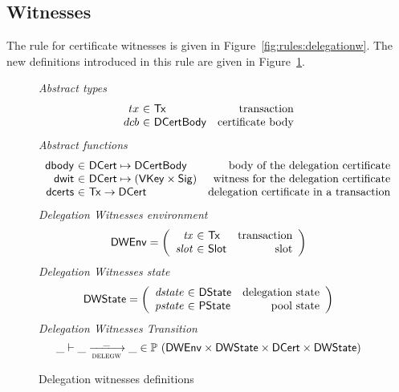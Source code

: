 \begin{figure}
\end{figure}

\subsection{Witnesses}
\label{sec:delegation-witnesses}

The rule for certificate witnesses is given in
Figure~\ref{fig:rules:delegationw}. The new definitions introduced in this rule
are given in Figure~\ref{fig:defs:delegationw}.

\begin{figure}
  \emph{Abstract types}
  \begin{equation*}
    \begin{array}{r@{~\in~}lr}
      tx & \Tx & \text{transaction}\\
      dcb & \DCertBody & \text{certificate body}\\
    \end{array}
  \end{equation*}
  \emph{Abstract functions}
  \begin{equation*}
    \begin{array}{r@{~\in~}lr}
      \fun{dbody} & \DCert \mapsto \DCertBody
      & \text{body of the delegation certificate}\\
      \fun{dwit} & \DCert \mapsto (\VKey \times \Sig)
      & \text{witness for the delegation certificate}\\
      \fun{dcerts} & \Tx \to \DCert
      & \text{delegation certificate in a transaction}\\
    \end{array}
  \end{equation*}
  \emph{Delegation Witnesses environment}
  \begin{equation*}
    \DWEnv =
    \left(
      \begin{array}{r@{~\in~}lr}
        \var{tx} & \Tx & \text{transaction}\\
        \var{slot} & \Slot & \text{slot}\\
      \end{array}
    \right)
  \end{equation*}
  \emph{Delegation Witnesses state}
  \begin{equation*}
    \DWState =
    \left(
      \begin{array}{r@{~\in~}lr}
        \var{dstate} & \DState & \text{delegation state}\\
        \var{pstate} & \PState & \text{pool state}\\
      \end{array}
    \right)
  \end{equation*}
  \emph{Delegation Witnesses Transition}
  \begin{equation*}
    \_ \vdash \_ \trans{delegw}{\_} \_ \in
      \powerset (
        \DWEnv \times \DWState \times \DCert \times \DWState)
  \end{equation*}
  \caption{Delegation witnesses definitions}
  \label{fig:defs:delegationw}
\end{figure}

